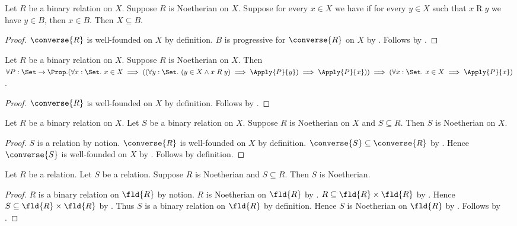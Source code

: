 \begin{theorem}\label{noetherian_induction_set}
    Let $R$ be a binary relation on $X$.
    Suppose $R$ is Noetherian on $X$.
    Suppose for every $x\in X$ we have
        if for every $y\in X$ such that $x\mathrel{R}y$ we have $y\in B$,
        then $x\in B$.
    Then $X\subseteq B$.
\end{theorem}
\begin{proof}
    $\converse{R}$ is well-founded on $X$ by definition.
    $B$ is progressive for $\converse{R}$ on $X$ by
        .
    Follows by .
\end{proof}

\begin{theorem}\label{noetherian_induction}
    Let $R$ be a binary relation on $X$.
    Suppose $R$ is Noetherian on $X$.
    Then $\forall P:\Set\to\Prop.
        (\forall x:\Set.\ x\in X\implies
            ((\forall y:\Set.\ (y\in X\land x\mathrel{R}y)
                \implies\Apply{P}{y})
            \implies\Apply{P}{x}))\implies
        (\forall x:\Set.\ x\in X\implies\Apply{P}{x})$.
\end{theorem}
\begin{proof}
    $\converse{R}$ is well-founded on $X$ by definition.
    Follows by .
\end{proof}

\begin{proposition}\label{noetherian_on_subrelation}
    Let $R$ be a binary relation on $X$.
    Let $S$ be a binary relation on $X$.
    Suppose $R$ is Noetherian on $X$ and $S\subseteq R$.
    Then $S$ is Noetherian on $X$.
\end{proposition}
\begin{proof}
    $S$ is a relation by notion.
    $\converse{R}$ is well-founded on $X$ by definition.
    $\converse{S}\subseteq\converse{R}$
        by .
    Hence $\converse{S}$ is well-founded on $X$
        by .
    Follows by definition.
\end{proof}

\begin{proposition}\label{noetherian_subrelation}
    Let $R$ be a relation.
    Let $S$ be a relation.
    Suppose $R$ is Noetherian and $S\subseteq R$.
    Then $S$ is Noetherian.
\end{proposition}
\begin{proof}
    $R$ is a binary relation on $\fld{R}$ by notion.
    $R$ is Noetherian on $\fld{R}$
        by .
    $R\subseteq\fld{R}\times\fld{R}$
        by .
    Hence $S\subseteq\fld{R}\times\fld{R}$
        by .
    Thus $S$ is a binary relation on $\fld{R}$ by definition.
    Hence $S$ is Noetherian on $\fld{R}$
        by .
    Follows by .
\end{proof}

